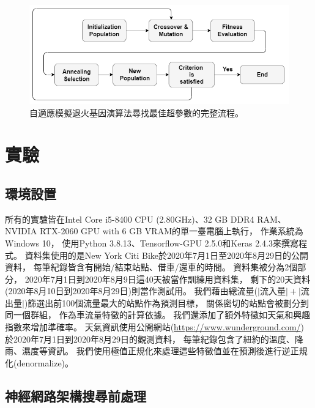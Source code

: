 \documentclass[a4paper,14pt]{extarticle}
\begin{document}
            \begin{figure}[htbp]
                \centering
                \includegraphics[width=\textwidth]{SAGA_scheme.png}
                \caption{
                    自適應模擬退火基因演算法尋找最佳超參數的完整流程。
                }
                \label{fig:SAGA_scheme}
            \end{figure}
            

    \newpage

    \section{實驗}
        \subsection{環境設置}
            
            所有的實驗皆在Intel Core i5-8400 CPU (2.80GHz)、32 GB DDR4 RAM、NVIDIA RTX-2060 GPU with 6 GB VRAM的單一臺電腦上執行，
            作業系統為Windows 10，
            使用Python 3.8.13、Tensorflow-GPU 2.5.0和Keras 2.4.3來撰寫程式。
            資料集使用的是New York Citi Bike於2020年7月1日至2020年8月29日的公開資料，
            每筆紀錄皆含有開始/結束站點、借車/還車的時間。
            資料集被分為2個部分，
            2020年7月1日到2020年8月9日這40天被當作訓練用資料集，
            剩下的20天資料(2020年8月10日到2020年8月29日)則當作測試用。
            我們藉由總流量($\lvert$流入量$\rvert + \lvert$流出量$\rvert$)篩選出前100個流量最大的站點作為預測目標，
            關係密切的站點會被劃分到同一個群組，
            作為車流量特徵的計算依據。
            我們還添加了額外特徵如天氣和興趣指數來增加準確率。
            天氣資訊使用公開網站(\url{https://www.wunderground.com/})
            於2020年7月1日到2020年8月29日的觀測資料，
            每筆紀錄包含了紐約的溫度、降雨、濕度等資訊。
            我們使用極值正規化來處理這些特徵值並在預測後進行逆正規化(denormalize)。

        \subsection{神經網路架構搜尋前處理}
\end{document}
